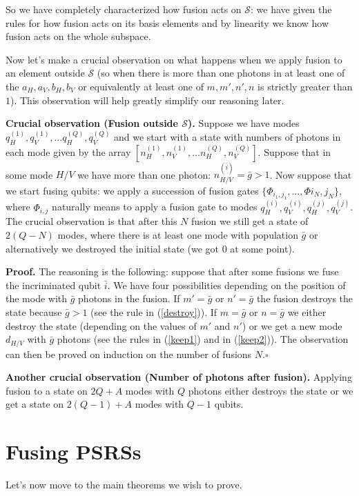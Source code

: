 \documentclass{article}
\begin{document}
So we have completely characterized how fusion acts on $\mathcal{S}$: we have given the rules for how fusion acts on its basis elements and by linearity we know how fusion acts on the whole subspace.

Now let's make a crucial observation on what happens when we apply fusion to an element outside $\mathcal{S}$ (so when there is more than one photons in at least one of the $a_H, a_V, b_H, b_V$ or equivalently at least one of $m, m', n', n$ is strictly greater than $1$). This observation will help greatly simplify our reasoning later.

\textbf{Crucial observation (Fusion outside $\mathcal{S}$).} Suppose we have modes\\$q^{(1)}_H, q^{(1)}_V, \dots q^{(Q)}_H, q^{(Q)}_V$ and we start with a state with numbers of photons in each mode given by the array $[n^{(1)}_H, n^{(1)}_V, \dots n^{(Q)}_H, n^{(Q)}_V]$. Suppose that in some mode $H/V$ we have more than one photon: $n^{(\bar{i})}_{H/V} =\bar{g}> 1$. Now suppose that we start fusing qubits: we apply a succession of fusion gates $\{\Phi_{i_1, j_1}, \dots, \Phi{i_N, j_N}\}$, where $\Phi_{i, j}$ naturally means to apply a fusion gate to modes $q^{(i)}_H, q^{(i)}_V,  q^{(j)}_H, q^{(j)}_V$. The crucial observation is that after this $N$ fusion we still get a state of $2(Q-N)$ modes, where there is at least one mode with population $\bar{g}$ or alternatively we destroyed the initial state (we got $0$ at some point).

\textbf{Proof.} The reasoning is the following: suppose that after some fusions we fuse the incriminated qubit $\bar{i}$. We have four possibilities depending on the position of the mode with $\bar{g}$ photons in the fusion. If $m' = \bar{g}$ or $n' = \bar{g}$ the fusion destroys the state because $\bar{g} > 1$ (see the rule in (\ref{destroy})). If $m = \bar{g}$ or $n = \bar{g}$ we either destroy the state (depending on the values of $m'$ and $n'$) or we get a new mode $d_{H/V}$ with $\bar{g}$ photons (see the rules in (\ref{keep1}) and in (\ref{keep2})). The observation can then be proved on induction on the number of fusions $N$.\hfill $\square$

\textbf{Another crucial observation (Number of photons after fusion).} Applying fusion to a state on $2Q+A$ modes with $Q$ photons either destroys the state or we get a state on $2(Q-1)+A$ modes with $Q-1$ qubits.

\newpage
\section{Fusing PSRSs}
Let's now move to the main theorems we wish to prove.
\end{document}
